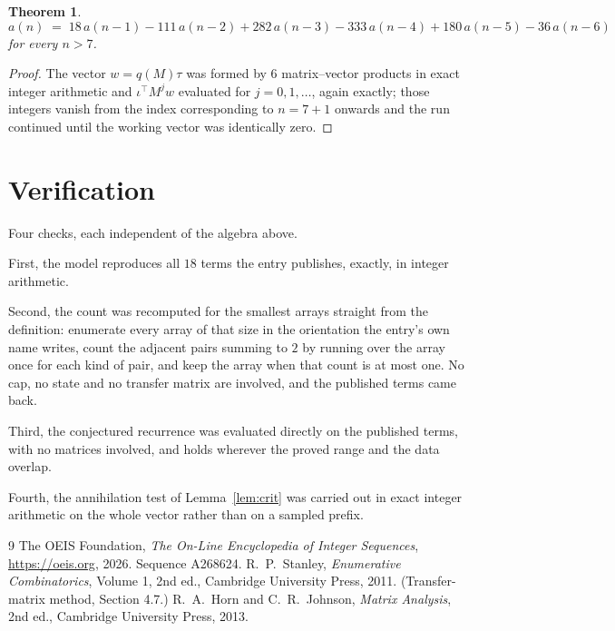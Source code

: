 \documentclass[11pt,a4paper]{article}
\theoremstyle{plain}
\newtheorem{theorem}{Theorem}
\theoremstyle{definition}
\begin{document}
\begin{theorem}
\[
a(n)\;=\;18\,a(n-1) - 111\,a(n-2) + 282\,a(n-3) - 333\,a(n-4) + 180\,a(n-5) - 36\,a(n-6)
\]
for every $n>7$.
\end{theorem}

\begin{proof}
The vector $w=q(M)\tau$ was formed by $6$ matrix--vector products in exact integer
arithmetic and $\iota^{\!\top}M^{j}w$ evaluated for $j=0,1,\dots$, again exactly; those
integers vanish from the index corresponding to $n=7+1$ onwards and the run continued
until the working vector was identically zero.
\end{proof}

\section{Verification}

Four checks, each independent of the algebra above.

First, the model reproduces all $18$ terms the entry publishes, exactly, in integer
arithmetic.

Second, the count was recomputed for the smallest arrays straight from the definition:
enumerate every array of that size in the orientation the entry's own name writes, count the
adjacent pairs summing to $2$ by running over the array once for each kind of pair, and keep
the array when that count is at most one. No cap, no state and no transfer matrix are involved, and
the published terms came back.

Third, the conjectured recurrence was evaluated directly on the published terms, with no
matrices involved, and holds wherever the proved range and the data overlap.

Fourth, the annihilation test of Lemma~\ref{lem:crit} was carried out in exact integer
arithmetic on the whole vector rather than on a sampled prefix.

\begin{thebibliography}{9}
 The OEIS Foundation, \emph{The On-Line Encyclopedia of Integer
Sequences}, \url{https://oeis.org}, 2026. Sequence A268624.
 R.~P.~Stanley, \emph{Enumerative Combinatorics}, Volume 1, 2nd ed.,
Cambridge University Press, 2011. (Transfer-matrix method, Section 4.7.)
 R.~A.~Horn and C.~R.~Johnson, \emph{Matrix Analysis}, 2nd ed., Cambridge
University Press, 2013.
\end{thebibliography}
\end{document}
